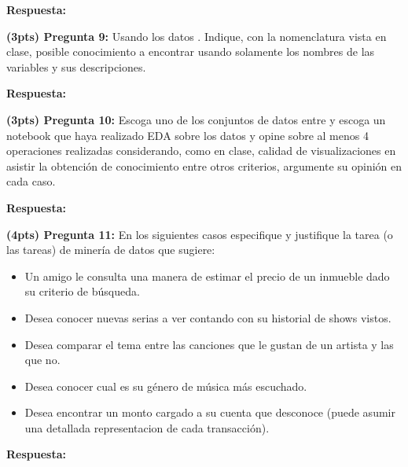 \documentclass[twoside,11pt]{article}
\newcommand\studentNumber{XXXXXXXX}          %
\newcommand{\customBlock}[1]{}
\begin{document}
\textbf{Respuesta: } {\color{ucvia}}
\vskip 0.3in

\textbf{(3pts) Pregunta 9:} Usando los datos \customBlock{p2}.
Indique, con la nomenclatura vista en clase, posible conocimiento a encontrar usando solamente los nombres de las variables y sus descripciones.

\textbf{Respuesta: } {\color{ucvia}}
\vskip 0.3in

\textbf{(3pts) Pregunta 10:} Escoga uno de los conjuntos de datos entre \customBlock{p2} y escoga un notebook que haya realizado EDA sobre los datos y opine sobre al menos 4 operaciones realizadas considerando, como en clase, calidad de visualizaciones en asistir la obtención de conocimiento entre otros criterios, argumente su opinión en cada caso.

\textbf{Respuesta: } {\color{ucvia}}
\vskip 0.3in

\newpage
\textbf{(4pts) Pregunta 11:} En los siguientes casos especifique y justifique la tarea (o las tareas) de miner\'ia de datos que sugiere:
\begin{itemize}
    \item Un amigo le consulta una manera de estimar el precio de un inmueble dado su criterio de b\'usqueda.
    \item Desea conocer nuevas serias a ver contando con su historial de shows vistos.
    \item Desea comparar el tema entre las canciones que le gustan de un artista y las que no.
    \item Desea conocer cual es su g\'enero de m\'usica m\'as escuchado.
    \item Desea encontrar un monto cargado a su cuenta que desconoce (puede asumir una detallada representacion de cada transacci\'on).
\end{itemize}

\textbf{Respuesta: } {\color{ucvia}}
\vskip 0.3in
\vskip 0.5in

\end{document}
